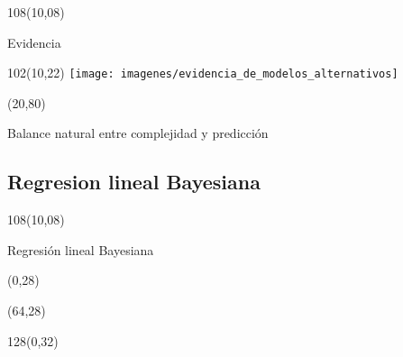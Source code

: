 \documentclass[shownotes]{beamer}
\begin{document}
\begin{frame}
\begin{textblock}{108}(10,08)
 \begin{center}
  \large  Evidencia
 \end{center}
\end{textblock}


 \begin{textblock}{102}(10,22)
  \centering
  \texttt{[image: imagenes/evidencia\_de\_modelos\_alternativos]} 
 \end{textblock} 
 
 
 \begin{textblock}{88}(20,80)
  \begin{mdframed}[backgroundcolor=black!15]
\centering
  Balance natural entre complejidad y predicci\'on
  \end{mdframed}
 \end{textblock}

   
  

 
\end{frame}

\subsection{Regresion lineal Bayesiana}

\begin{frame}
\begin{textblock}{108}(10,08)
 \begin{center}
  \large Regresi\'on lineal Bayesiana
 \end{center}
\end{textblock}



\begin{textblock}{64}(0,28)
 \centering
\end{textblock}

\begin{textblock}{64}(64,28)
 \centering
\end{textblock}

\begin{textblock}{128}(0,32)
     \centering 
\end{textblock}

\end{frame}
\end{document}
